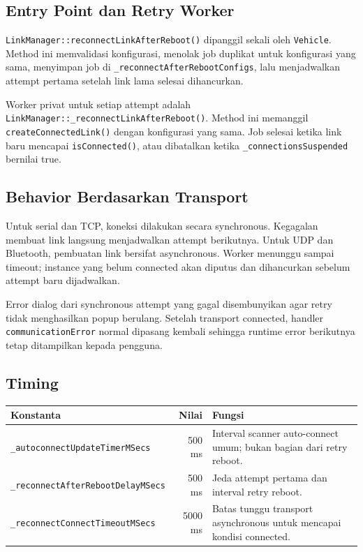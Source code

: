 \documentclass[11pt,a4paper]{article}
\begin{document}
\subsection{Entry Point dan Retry Worker}

\nolinkurl{LinkManager::reconnectLinkAfterReboot()} dipanggil sekali oleh
\texttt{Vehicle}. Method ini memvalidasi konfigurasi, menolak job duplikat untuk
konfigurasi yang sama, menyimpan job di
\nolinkurl{_reconnectAfterRebootConfigs}, lalu menjadwalkan attempt pertama setelah
link lama selesai dihancurkan.

Worker privat untuk setiap attempt adalah
\nolinkurl{LinkManager::_reconnectLinkAfterReboot()}. Method ini memanggil
\texttt{createConnectedLink()} dengan konfigurasi yang sama. Job selesai ketika link
baru mencapai \texttt{isConnected()}, atau dibatalkan ketika
\texttt{\_connectionsSuspended} bernilai true.

\subsection{Behavior Berdasarkan Transport}

Untuk serial dan TCP, koneksi dilakukan secara synchronous. Kegagalan membuat link
langsung menjadwalkan attempt berikutnya. Untuk UDP dan Bluetooth, pembuatan link
bersifat asynchronous. Worker menunggu sampai timeout; instance yang belum
connected akan diputus dan dihancurkan sebelum attempt baru dijadwalkan.

Error dialog dari synchronous attempt yang gagal disembunyikan agar retry tidak
menghasilkan popup berulang. Setelah transport connected, handler
\texttt{communicationError} normal dipasang kembali sehingga runtime error
berikutnya tetap ditampilkan kepada pengguna.

\subsection{Timing}

\begin{table}[H]
\centering
\begin{tabularx}{\textwidth}{Y r Y}
\toprule
\textbf{Konstanta} & \textbf{Nilai} & \textbf{Fungsi} \\
\midrule
\nolinkurl{_autoconnectUpdateTimerMSecs} &
500 ms &
Interval scanner auto-connect umum; bukan bagian dari retry reboot. \\

\nolinkurl{_reconnectAfterRebootDelayMSecs} &
500 ms &
Jeda attempt pertama dan interval retry reboot. \\

\nolinkurl{_reconnectConnectTimeoutMSecs} &
5000 ms &
Batas tunggu transport asynchronous untuk mencapai kondisi connected. \\
\bottomrule
\end{tabularx}
\end{table}
\end{document}
